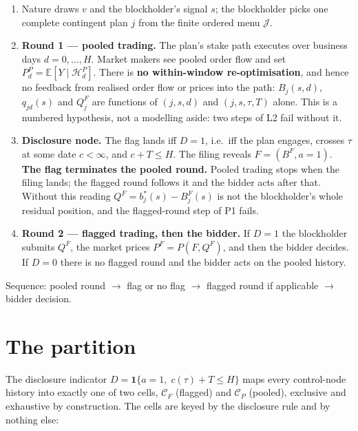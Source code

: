 \documentclass[11pt,a4paper]{article}
\newcommand{\Eop}{\mathbb{E}}
\newcommand{\ind}{\mathbf{1}}
\begin{document}
\begin{enumerate}
\item Nature draws $v$ and the blockholder's signal $s$; the blockholder picks one
  complete contingent plan $j$ from the finite ordered menu $\mathcal J$.

\item \textbf{Round 1 --- pooled trading.} The plan's stake path executes over
  business days $d=0,\dots,H$. Market makers see pooled order flow and set
  $P_d^P=\Eop[Y\mid\mathcal H_d^P]$. There is \textbf{no within-window
  re-optimisation}, and hence no feedback from realised order flow or prices into
  the path: $B_j(s,d)$, $q_{jd}(s)$ and $Q_j^F$ are functions of $(j,s,d)$ and
  $(j,s,\tau,T)$ alone. This is a numbered hypothesis, not a modelling aside: two
  steps of L2 fail without it.

\item \textbf{Disclosure node.} The flag lands iff $D=1$, i.e.\ iff the plan
  engages, crosses $\tau$ at some date $c<\infty$, and $c+T\le H$. The filing
  reveals $F=(B^F,a=1)$. \textbf{The flag terminates the pooled round.} Pooled
  trading stops when the filing lands; the flagged round follows it and the bidder
  acts after that. Without this reading $Q^F=b_j^*(s)-B_j^F(s)$ is not the
  blockholder's whole residual position, and the flagged-round step of P1 fails.

\item \textbf{Round 2 --- flagged trading, then the bidder.} If $D=1$ the
  blockholder submits $Q^F$, the market prices $P^F=P(F,Q^F)$, and then the bidder
  decides. If $D=0$ there is no flagged round and the bidder acts on the pooled
  history.
\end{enumerate}

Sequence: pooled round $\to$ flag or no flag $\to$ flagged round if applicable $\to$
bidder decision.

\section{The partition}

The disclosure indicator $D=\ind\{a=1,\;c(\tau)+T\le H\}$ maps every control-node
history into exactly one of two cells, $\mathcal C_F$ (flagged) and $\mathcal C_P$
(pooled), exclusive and exhaustive by construction. The cells are keyed by the
disclosure rule and by nothing else:
\end{document}
